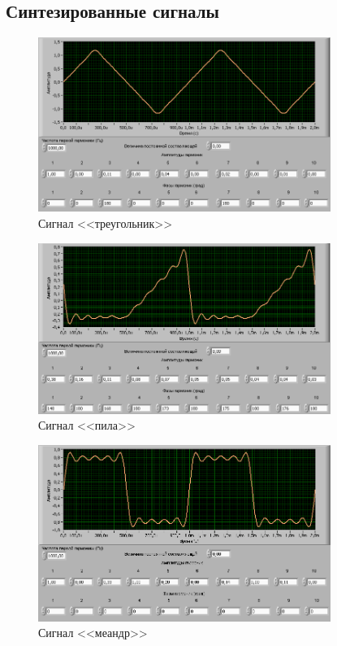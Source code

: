 \subsection{Синтезированные сигналы}
\begin{figure}[H]
	\centering
	\includegraphics[width=0.85\textwidth]{pic/sint/triangle.png}
	\caption{Сигнал <<треугольник>>}
	
\end{figure}
\begin{figure}[H]
	\centering
	\includegraphics[width=0.85\textwidth]{pic/sint/pila.png}
	\caption{Сигнал <<пила>>}
	
\end{figure}
\begin{figure}[H]
	\centering
	\includegraphics[width=0.85\textwidth]{pic/sint/meandr.png}
	\caption{Сигнал <<меандр>>}
	
\end{figure}

